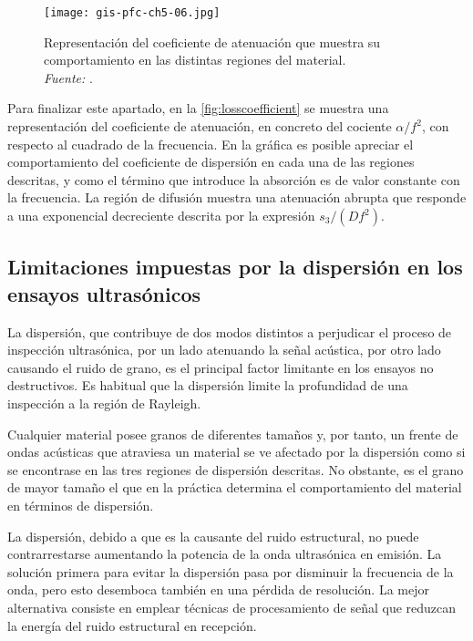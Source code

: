 \begin{figure}
    \begin{center}
	\texttt{[image: gis-pfc-ch5-06.jpg]}
    \end{center}
    \caption[Comportamiento del coeficiente de atenuación]{Representación
    del coeficiente de atenuación que muestra su comportamiento en las
    distintas regiones del material. \\\emph{Fuente:}
    \citet{garcia2000mrsr}.}
    \label{fig:losscoefficient}
\end{figure}

Para finalizar este apartado, en la \vref{fig:losscoefficient} se muestra
una representación del coeficiente de atenuación, en concreto del cociente
$\alpha/f^2$, con respecto al cuadrado de la frecuencia. En la gráfica es
posible apreciar el comportamiento del coeficiente de dispersión en cada
una de las regiones descritas, y como el término que introduce la absorción
es de valor constante con la frecuencia. La región de difusión muestra una
atenuación abrupta que responde a una exponencial decreciente descrita por
la expresión $s_3/(Df^2)$.


\subsection[Limitaciones impuestas por la dispersión]{Limitaciones
impuestas por la dispersión en los ensayos ultrasónicos}

La dispersión, que contribuye de dos modos distintos a perjudicar el
proceso de inspección ultrasónica, por un lado atenuando la señal acústica,
por otro lado causando el ruido de grano, es el principal factor limitante
en los ensayos no destructivos. Es habitual que la dispersión limite la
profundidad de una inspección a la región de Rayleigh.

Cualquier material posee granos de diferentes tamaños y, por tanto, un
frente de ondas acústicas que atraviesa un material se ve afectado por la
dispersión como si se encontrase en las tres regiones de dispersión
descritas. No obstante, es el grano de mayor tamaño el que en la práctica
determina el comportamiento del material en términos de dispersión.

La dispersión, debido a que es la causante del ruido estructural, no puede
contrarrestarse aumentando la potencia de la onda ultrasónica en emisión.
La solución primera para evitar la dispersión pasa por disminuir la
frecuencia de la onda, pero esto desemboca también en una pérdida de
resolución. La mejor alternativa consiste en emplear técnicas de
procesamiento de señal que reduzcan la energía del ruido estructural en
recepción.


